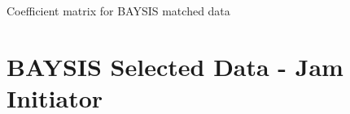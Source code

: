 \begin{appendices}
    \begin{sidewaystable}
    	\fontsize{3}{5}\selectfont
    	\setlength{\tabcolsep}{2pt}
    	\centering
    	
    	\caption{Coefficient matrix for BAYSIS matched data}
    	\label{table:appendix_coefficient_matrix_matched}
    	\end{sidewaystable}
    \restoregeometry
    
    \tocless\section{BAYSIS Selected Data - Jam Initiator}
    \label{appendix_baysis_selected_startJam}
    
    
    
    
    

\end{appendices}
